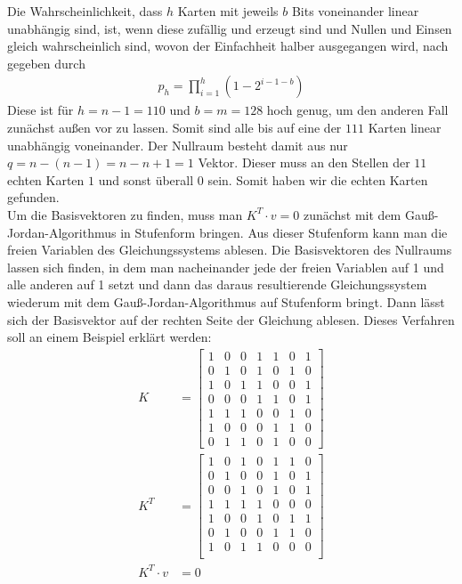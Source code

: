 \documentclass[a4paper,10pt,ngerman]{scrartcl}
\begin{document}
Die Wahrscheinlichkeit, dass $h$ Karten mit jeweils $b$ Bits voneinander linear unabhängig sind, ist, wenn diese zufällig und erzeugt sind und Nullen und Einsen gleich wahrscheinlich sind, wovon der Einfachheit halber ausgegangen wird, nach \cite{WEBSITE:1} gegeben durch
\begin{align*}
p_h = \prod^h_{i=1} (1-2^{i-1-b})
\end{align*}
Diese ist für $h=n-1=110$ und $b=m=128$ hoch genug, um den anderen Fall zunächst außen vor zu lassen. Somit sind alle bis auf eine der $111$ Karten linear unabhängig voneinander. Der Nullraum besteht damit aus nur $q=n-(n-1)=n-n+1=1$ Vektor. Dieser muss an den Stellen der $11$ echten Karten $1$ und sonst überall $0$ sein. Somit haben wir die echten Karten gefunden. \\
Um die Basisvektoren zu finden, muss man $K^T \cdot v = 0$ zunächst mit dem Gauß-Jordan-Algorithmus in Stufenform bringen. Aus dieser Stufenform kann man die freien Variablen des Gleichungssystems ablesen. Die Basisvektoren des Nullraums lassen sich finden, in dem man nacheinander jede der freien Variablen auf 1 und alle anderen auf 1 setzt und dann das daraus resultierende Gleichungssystem wiederum mit dem Gauß-Jordan-Algorithmus auf Stufenform bringt. Dann lässt sich der Basisvektor auf der rechten Seite der Gleichung ablesen. Dieses Verfahren soll an einem Beispiel erklärt werden:
\begin{align*}
K&= \left[
\begin{array}{ccccccc}
1 & 0 & 0 & 1 & 1 & 0 & 1 \\ 
0 & 1 & 0 & 1 & 0 & 1 & 0 \\ 
1 & 0 & 1 & 1 & 0 & 0 & 1 \\ 
0 & 0 & 0 & 1 & 1 & 0 & 1 \\ 
1 & 1 & 1 & 0 & 0 & 1 & 0 \\ 
1 & 0 & 0 & 0 & 1 & 1 & 0 \\ 
0 & 1 & 1 & 0 & 1 & 0 & 0
\end{array} \right] \\
K^T&=\left[
\begin{array}{ccccccc}
1&0&1&0&1&1&0\\
0&1&0&0&1&0&1\\
0&0&1&0&1&0&1\\
1&1&1&1&0&0&0\\
1&0&0&1&0&1&1\\
0&1&0&0&1&1&0\\
1&0&1&1&0&0&0\\
\end{array}\right]\\
K^T \cdot v &= 0\\
\end{align*}
\end{document}
